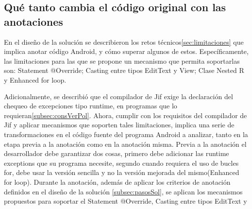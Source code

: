 \subsection{Qué tanto cambia el código original con las anotaciones}
En el diseño de la solución se describieron los retos
técnicos\ref{sec:limitaciones} que implica anotar código Android, y cómo superar
algunos de estos. Específicamente, las limitaciones para las que se propone un
mecanismo que permita soportarlas son: Statement @Override; Casting entre tipos
EditText y View; Clase Nested R y Enhanced for loop.

% 
Adicionalmente, se describió que el compilador de Jif exige la declaración del
chequeo de excepciones tipo runtime, en programas que lo
requieran\ref{subsec:consVerPol}. Ahora, cumplir con los requisitos del
compilador de Jif y aplicar mecanismos que soporten tales limitaciones, implica
una serie de transformaciones en el código fuente del programa Android a
analizar, tanto en la etapa previa a la anotación como en la anotación
misma.\newline
Previa a la anotación el desarrollador debe garantizar dos cosas, primero debe
adicionar las runtime exceptions que su programa necesite, segundo cuando
requiera el uso de bucles for, debe usar la versión sencilla y no la versión
mejorada del mismo(Enhanced for loop).\newline 
Durante la anotación, además de aplicar los criterios de anotación definidos en
el diseño de la solución \ref{subsec:pasosSol}, se aplican los mecanismos
propuestos para soportar el Statement @Override, Casting entre tipos EditText y
